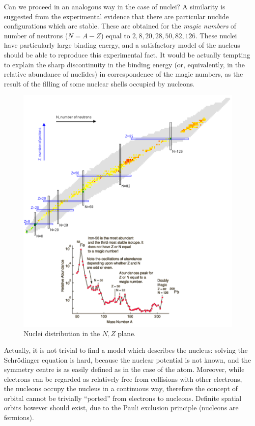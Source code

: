 Can we proceed in an analogous way in the case of nuclei? A similarity is suggested from the experimental evidence that there are particular nuclide configurations which are stable. These are obtained for the \textit{magic numbers} of number of neutrons (\(N = A - Z\)) equal to \(2, 8, 20, 28, 50, 82, 126\). These nuclei have particularly large binding energy, and a satisfactory model of the nucleus should be able to reproduce this experimental fact. It would be actually tempting to explain the sharp discontinuity in the binding energy (or, equivalently, in the relative abundance of nuclides) in correspondence of the magic numbers, as the result of the filling of some nuclear shells occupied by nucleons.
\begin{figure}[h]
    \centering
    \includegraphics[scale=0.38]{Figures/nuclear-physics-fig11}
    \caption{Nuclei distribution in the \(N, Z\) plane.}
    \label{nuclear-physics-fig:11}
\end{figure}

Actually, it is not trivial to find a model which describes the nucleus: solving the Schr\"odinger equation is hard, because the nuclear potential is not known, and the symmetry centre is as easily defined as in the case of the atom. Moreover, while electrons can be regarded as relatively free from  collisions with other electrons, the nucleons occupy the nucleus in a continuous way, therefore the concept of orbital cannot be trivially ``ported'' from electrons to nucleons. Definite spatial orbits however should exist, due to the Pauli exclusion principle (nucleons are fermions).

